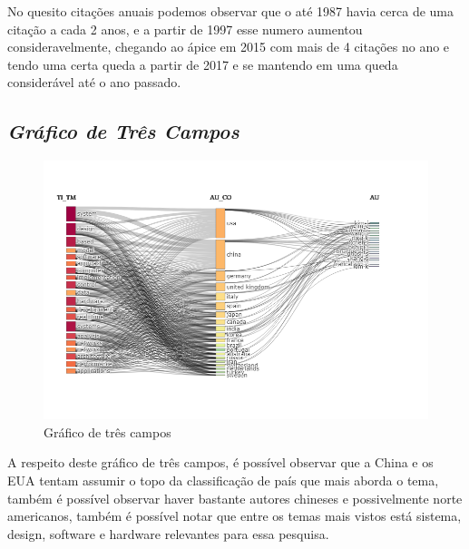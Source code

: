 No quesito citações anuais podemos observar que o até 1987 havia cerca de uma citação a cada 2 anos, e a partir de 1997 esse numero aumentou consideravelmente, chegando ao ápice em 2015 com mais de 4 citações no ano e tendo uma certa queda a partir de 2017 e se mantendo em uma queda considerável até o ano passado.

\subsection{\textit{Gráfico de Três Campos}}

\begin{figure}[h]
    \centering
    \includegraphics[width=12cm]{experiments/GMalme/AnaliseBibliometrica/ImpactoDeJogosNaTecnologia/Figs/Three-Fields Plot.png}
    \caption{Gráfico de três campos}
    \label{fig:AIJ_graficoCampos}
\end{figure}

A respeito deste gráfico de três campos, é possível observar que a China e os EUA tentam assumir o topo da classificação de país que mais  aborda o tema, também é possível observar haver bastante autores chineses e possivelmente norte americanos, também é possível notar que entre os temas mais vistos está sistema, design, software e hardware relevantes para essa pesquisa.